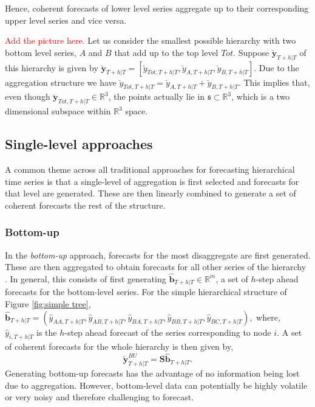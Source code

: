 \documentclass[graybox]{svmult}
\begin{document}
Hence, coherent forecasts of lower level series aggregate up to their corresponding upper level series and vice versa.

\textcolor{red}{Add the picture here.}
Let us consider the smallest possible hierarchy with two bottom level series, $A$ and $B$ that add up to the top level $Tot$. Suppose $\breve{\bm{y}}_{T+h|T}$ of this hierarchy is given by $\breve{\bm{y}}_{T+h|T} = [\breve{y}_{Tot,T+h|T},\breve{y}_{A,T+h|T}, \breve{y}_{B,T+h|T}]$. Due to the aggregation structure we have $\breve{y}_{Tot,T+h|T}=\breve{y}_{A,T+h|T}+\breve{y}_{B,T+h|T}$. This implies that, even though  $\breve{\bm{y}}_{Tot,T+h|T} \in \mathbb{R}^3$, the points actually lie in $\mathfrak{s}\subset \mathbb{R}^3$, which is a two dimensional subspace within $\mathbb{R}^3$ space.

\subsection{Single-level approaches}\label{sec:single level approaches}
A common theme across all traditional approaches for forecasting hierarchical time series is that a single-level of aggregation is first selected and forecasts for that level are generated. These are then linearly combined to generate a set of coherent forecasts the rest of the structure.

\subsubsection{Bottom-up}

In the \textit{bottom-up} approach, forecasts for the most disaggregate are first generated. These are then aggregated to obtain forecasts for all other series of the hierarchy \citep{dunn1976}. In general, this consists of first generating $\hat{\bm{b}}_{T+h|T} \in \mathbb{R}^m$, a set of $h$-step ahead forecasts for the bottom-level series. For the simple hierarchical structure of Figure \ref{fig:simple tree}, $\hat{\bm{b}}_{T+h|T} = (\hat{{y}}_{AA,T+h|T}, \hat{{y}}_{AB,T+h|T}, \hat{{y}}_{BA,T+h|T}, \hat{{y}}_{BB,T+h|T},\hat{{y}}_{BC,T+h|T}),$ where, $\hat{{y}}_{i,T+h|T}$ is the $h$-step ahead forecast of the series corresponding to node $i$. A set of coherent forecasts for the whole hierarchy is then given by,
\begin{equation*}\label{eq:BU}
\tilde{\bm{y}}^{BU}_{T+h|T}=\bm{S\hat{\bm{b}}}_{T+h|T}.
\end{equation*}
Generating bottom-up forecasts has the advantage of no information being lost due to aggregation. However, bottom-level data can potentially be highly volatile or very noisy and therefore challenging to forecast.
\end{document}

